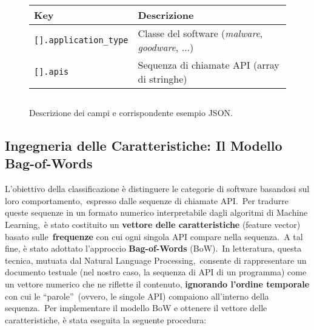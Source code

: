 \begin{figure}[h!]
    \centering
    \renewcommand{\arraystretch}{1.3}
    \begin{tabular}{p{} p{}}
        \toprule
        \textbf{Key}                  & \textbf{Descrizione}                                           \\
        \midrule
        \texttt{[].application\_type} & Classe del software (\emph{malware}, \emph{goodware}, $\dots$) \\
        \texttt{[].apis}              & Sequenza di chiamate API (array di stringhe)                   \\
        \bottomrule
    \end{tabular}

    \vspace{4mm} %

    \inputminted[fontsize=\small]{json}{approccio-proposto/example.json}
    \caption{Descrizione dei campi e corrispondente esempio JSON.}
    \label{fig:json-struct}
\end{figure}

\subsection{Ingegneria delle Caratteristiche: Il Modello Bag-of-Words}

L'obiettivo della classificazione è distinguere le categorie di software basandosi sul loro comportamento,\
espresso dalle sequenze di chiamate API.\
Per tradurre queste sequenze in un formato numerico interpretabile dagli algoritmi di Machine Learning,\
è stato costituito un \textbf{vettore delle caratteristiche} (feature vector) basato sulle\
\textbf{frequenze} con cui ogni singola API compare nella sequenza.\
A tal fine, è stato adottato l'approccio \textbf{Bag-of-Words} (BoW).\
In letteratura, questa tecnica, mutuata dal Natural Language Processing,\
consente di rappresentare un documento testuale (nel nostro caso, la sequenza di API di un programma)
come un vettore numerico che ne riflette il contenuto, \textbf{ignorando l'ordine temporale} con cui le ``parole''\
(ovvero, le singole API) compaiono all'interno della sequenza.\
Per implementare il modello BoW e ottenere il vettore delle caratteristiche, è stata eseguita la seguente procedura:

